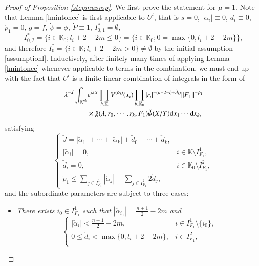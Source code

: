 \documentclass[11pt,reqno]{amsart}
\def\d{{\rm d}}
\numberwithin{equation}{section}
\theoremstyle{definition}
\begin{document}
\begin{proof}[Proof of Proposition \ref{stepmuprop}]
	We first prove the statement for $\mu=1$. Note that Lemma \ref{lmintonce} is first applicable to $U^l$, that is $\dot{s}=0$, $|\dot{\alpha}_i|\equiv0$, $\dot{d}_i\equiv0$, $\dot{p}_1=0$, $\dot{g}=f$, $\dot{\psi}=\phi$, $\dot{P}\equiv1$, $I_{0,1}^*=\emptyset$,
	\begin{equation}\label{I_02intitial}
		I_{0,2}^*=\{i\in\mathbb{K}_0;l_i+2-2m\leq0\}=\{i\in\mathbb{K}_0;0=\max\{0,l_i+2-2m\}\},
	\end{equation}
	and therefore $I_0^*=\{i\in\mathbb{K};l_i+2-2m>0\}\neq\emptyset$ by the initial assumption \eqref{assumptionl}. Inductively, after finitely many times of applying Lemma \ref{lmintonce} whenever applicable to terms in the combination, we must end up with the fact that $U^l$ is a finite linear combination of integrals in the form of
	\begin{equation}\label{J'}
		\begin{split}
			\lambda^{-\check{J}}\int_{\mathbb{R}^{nk}}&e^{\mathrm{i}\lambda X}\prod_{i\in\mathbb{K}}V^{(\check{\alpha}_i)}(x_i)\prod_{i\in\mathbb{K}_0}|r_i|^{-(n-2-l_i+\check{d}_i)}\|F_1\|^{-{\check{p}_1}}\\
			&\times\check{g}(\lambda,r_0,\cdots,r_k,F_1)\check{\psi}(X/T)\d x_1\cdots \d x_k,
		\end{split}
	\end{equation}
	satisfying
	\begin{equation*}
		\begin{cases}
			\check{J}=|\check{\alpha}_1|+\cdots+|\check{\alpha}_k|+\check{d}_0+\cdots+\check{d}_k,\\
			|\check{\alpha}_i|=0,\quad&i\in\mathbb{K}\setminus I_{F_1}^1,\\
			\check{d}_i=0,&i\in\mathbb{K}_0\setminus I_{F_1}^2,\\
			\check{p}_1\leq\sum_{j\in I_{F_1}^1}|\check{\alpha}_j|+\sum_{j\in I_{F_1}^2}2\check{d}_j,
		\end{cases}
	\end{equation*}
	and the subordinate parameters are subject to three cases:
	\begin{itemize}
		\item[\emph{Case 1}] \textit{There exists $i_0\in I_{F_1}^1$ such that $|\check{\alpha}_{i_0}|=\frac{n+1}{2}-2m$ and}
		\begin{equation*}
			\begin{cases}
				|\check{\alpha}_i|<\frac{n+1}{2}-2m,\quad&i\in I_{F_1}^1\setminus\{i_0\},\\
				0\leq \check{d}_i<\max\{0,l_i+2-2m\},&i\in I_{F_1}^2,\\

\end{cases}
\end{equation*}
\end{itemize}
\end{proof}
\end{document}
